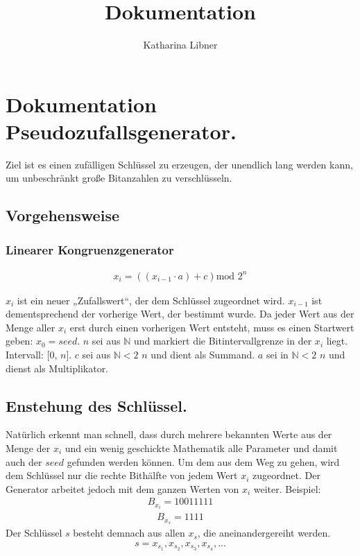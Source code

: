 \documentclass[10pt,a4paper]{article}
\author{Katharina Libner}
\title{Dokumentation}
\begin{document}
\maketitle
\tableofcontents
\newpage

\section{Dokumentation Pseudozufallsgenerator.}
Ziel ist es einen \glqq zufälligen\grqq{} Schlüssel zu erzeugen, der unendlich lang werden kann, um unbeschränkt große Bitanzahlen zu verschlüsseln.
\subsection{Vorgehensweise}

\subsubsection{Linearer Kongruenzgenerator}
\begin{align*}
        x_i=\left(\left( x_{i-1}\cdot a\right) +c\right) \text{mod } 2^n
\end{align*}

$x_i$ ist ein neuer „Zufallswert“, der dem Schlüssel zugeordnet wird. 
$x_{i-1}$ ist dementsprechend der vorherige Wert, der bestimmt wurde.
Da jeder Wert aus der Menge aller $x_i$ erst durch einen vorherigen Wert entsteht, muss es einen
Startwert geben: $x_0 = seed $.
$n$ sei aus $ \mathbb{N} $ und markiert die Bitintervallgrenze in der $x_i$
liegt. Intervall: [0, $n$].
$c$ sei aus  $ \mathbb{N}<2 $
$n$ und dient als Summand.
$a$ sei in $ \mathbb{N}< 2 $
$n$ und dienst als Multiplikator.
\subsection{Enstehung des Schlüssel.}
Natürlich erkennt man schnell, dass durch mehrere bekannten Werte aus der Menge der $x_i$ und ein wenig geschickte Mathematik alle Parameter und damit auch der $seed$ gefunden werden können. Um dem aus dem Weg zu gehen, wird dem Schlüssel nur die rechte Bithälfte von jedem Wert $x_i$ zugeordnet. Der Generator arbeitet jedoch mit dem ganzen Werten von $x_i$ weiter. Beispiel:
\begin{align*}
    B_{x_i} = 1001 1111
\end{align*}
\begin{align*}
    B_{x_s} = 1111
\end{align*}
Der Schlüssel $s$ besteht demnach aus allen $x_s$, die aneinandergereiht werden.
\begin{align*}
    s = x_{s_1}, x_{s_2}, x_{s_3}, x_{s_4}, ...
\end{align*}
\end{document}
